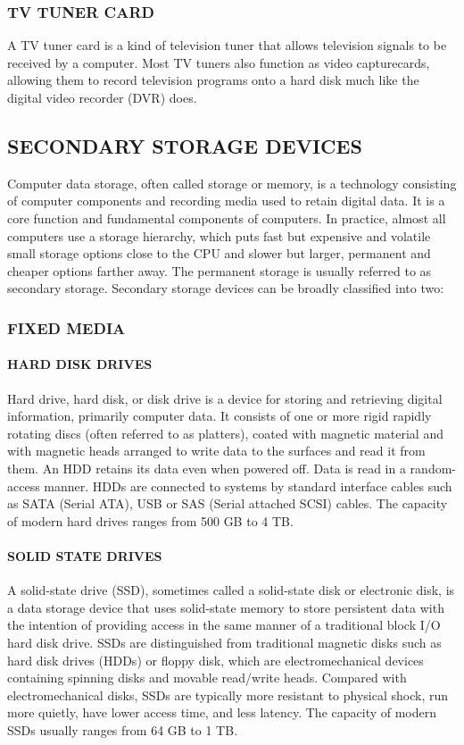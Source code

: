 \documentclass[a4paper,28pt,twoside,openright]{report}
\begin{document}
\subsubsection*{TV TUNER CARD}
	 A TV tuner card is a kind of television tuner that allows television signals to be received by
	a computer. Most TV tuners also function as video capturecards, allowing them to record television
	programs onto a hard disk much like the digital video recorder (DVR) does.
\subsection*{SECONDARY STORAGE DEVICES}
	Computer data storage, often called storage or memory, is a technology consisting of computer components
	and recording media used to retain digital data. It is a core function and fundamental components of
	computers. In practice, almost all computers use a storage hierarchy, which puts fast but expensive and volatile
	small storage options close to the CPU and slower but larger, permanent and cheaper options farther away. The
	permanent storage is usually referred to as secondary storage. Secondary storage devices can be broadly
	classified into two:
\subsubsection*{FIXED MEDIA}
	\paragraph{HARD DISK DRIVES}
	  Hard drive, hard disk, or disk drive is a device for
	storing and retrieving digital information, primarily computer data. It consists of one or more rigid rapidly rotating discs (often referred to as platters), coated with magnetic material and
	with magnetic heads arranged to write data to the surfaces and read it from them. An HDD retains its
	data even when powered off. Data is read in a random-access manner. HDDs are
	connected to systems by standard interface cables such as SATA (Serial ATA), USB or SAS (Serial
	attached SCSI) cables. The capacity of modern hard drives ranges from 500 GB to 4 TB.
	\paragraph{SOLID STATE DRIVES}
	A solid-state drive (SSD), sometimes called a solid-state disk or electronic disk, is a
	data storage device that uses solid-state memory to store persistent data with the intention of providing
	access in the same manner of a traditional block I/O hard disk drive. SSDs are distinguished from
	traditional magnetic disks such as hard disk drives (HDDs) or floppy disk, which are electromechanical
	devices containing spinning disks and movable read/write heads. Compared with electromechanical
	disks, SSDs are typically more resistant to physical shock, run more quietly, have lower access time,
	and less latency. The capacity of modern
	SSDs usually ranges from 64 GB to 1 TB.
\end{document}
